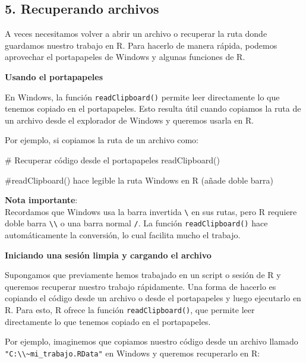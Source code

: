 \documentclass[
  letterpaper,
  DIV=11,
  numbers=noendperiod]{scrartcl}
\newenvironment{Shaded}{\begin{snugshade}}{\end{snugshade}}
\newcommand{\CommentTok}[1]{\textcolor[rgb]{0.37,0.37,0.37}{#1}}
\newcommand{\FunctionTok}[1]{\textcolor[rgb]{0.28,0.35,0.67}{#1}}
\newcommand{\NormalTok}[1]{\textcolor[rgb]{0.00,0.23,0.31}{#1}}
\begin{document}
\hypertarget{recuperando-archivos}{%
\subsection{5. Recuperando archivos}\label{recuperando-archivos}}

A veces necesitamos volver a abrir un archivo o recuperar la ruta donde
guardamos nuestro trabajo en R. Para hacerlo de manera rápida, podemos
aprovechar el portapapeles de Windows y algunas funciones de R.

\textbf{Usando el portapapeles}

En Windows, la función \texttt{readClipboard()} permite leer
directamente lo que tenemos copiado en el portapapeles. Esto resulta
útil cuando copiamos la ruta de un archivo desde el explorador de
Windows y queremos usarla en R.

Por ejemplo, si copiamos la ruta de un archivo como:

\begin{Shaded}
\begin{Highlighting}[]
\CommentTok{\# Recuperar código desde el portapapeles}
\FunctionTok{readClipboard}\NormalTok{()}

\CommentTok{\#readClipboard() hace legible la ruta Windows en R (añade doble barra)}
\end{Highlighting}
\end{Shaded}

\textbf{Nota importante}:\\

Recordamos que Windows usa la barra invertida \texttt{\textbackslash{}}
en sus rutas, pero R requiere doble barra
\texttt{\textbackslash{}\textbackslash{}} o una barra normal \texttt{/}.
La función \texttt{readClipboard()} hace automáticamente la conversión,
lo cual facilita mucho el trabajo.

\textbf{Iniciando una sesión limpia y cargando el archivo}

Supongamos que previamente hemos trabajado en un script o sesión de R y
queremos recuperar nuestro trabajo rápidamente. Una forma de hacerlo es
copiando el código desde un archivo o desde el portapapeles y luego
ejecutarlo en R. Para esto, R ofrece la función
\texttt{readClipboard()}, que permite leer directamente lo que tenemos
copiado en el portapapeles.

Por ejemplo, imaginemos que copiamos nuestro código desde un archivo
llamado
\texttt{"C:\textbackslash{}\textbackslash{}\textasciitilde{}mi\_trabajo.RData"}
en Windows y queremos recuperarlo en R:
\end{document}
